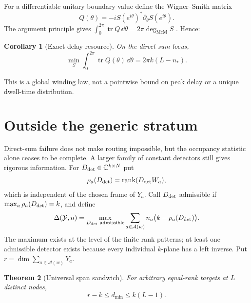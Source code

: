 \documentclass[11pt]{article}
\newtheorem{theorem}{Theorem}[section]
\newtheorem{corollary}[theorem]{Corollary}
\theoremstyle{definition}\newtheorem{definition}[theorem]{Definition}\newtheorem{example}[theorem]{Example}
\theoremstyle{remark}\newtheorem{remark}[theorem]{Remark}\newtheorem{limitation}[theorem]{Limitation}
\newcommand{\C}{\mathbb C}\newcommand{\D}{\mathbb D}\newcommand{\T}{\mathbb T}
\newcommand{\rank}{\operatorname{rank}}
\newcommand{\mcdeg}{\deg_{\mathrm{McM}}}\newcommand{\A}{\mathcal A}
\begin{document}
For a differentiable unitary boundary value define the Wigner--Smith matrix
\begin{equation}\label{eq:Q}
 Q(\theta)=-iS(e^{i\theta})^*\partial_\theta S(e^{i\theta}).
\end{equation}
The argument principle gives
$\int_0^{2\pi}\operatorname{tr}Q\,\dd\theta=2\pi\mcdeg S$
\cite{Wigner1955,Smith1960,Potapov1955}.  Hence:

\begin{corollary}[Exact delay resource]\label{cor:delay}
On the direct-sum locus,
\begin{equation}\label{eq:delay}
 \boxed{\quad
 \min_S\int_0^{2\pi}\operatorname{tr}Q(\theta)\,\dd\theta
       =2\pi k(L-n_*).\quad}
\end{equation}
\end{corollary}
This is a global winding law, not a pointwise bound on peak delay or a
unique dwell-time distribution.

\section{Outside the generic stratum}

Direct-sum failure does not make routing impossible, but the occupancy
statistic alone ceases to be complete.  A larger family of constant detectors
still gives rigorous information.  For $D_{\rm det}\in\C^{k\times N}$ put
\[
 \rho_a(D_{\rm det})=\rank(D_{\rm det}W_a),
\]
which is independent of the chosen frame of $Y_a$.  Call $D_{\rm det}$ admissible if
$\max_a\rho_a(D_{\rm det})=k$, and define
\begin{equation}\label{eq:detector-rank-statistic}
 \Delta(\mathcal Y,n)=
 \max_{D_{\rm det}\ {\rm admissible}}
       \sum_{a\in\A(w)} n_a\bigl(k-\rho_a(D_{\rm det})\bigr).
\end{equation}
The maximum exists at the level of the finite rank patterns; at least one
admissible detector exists because every individual $k$-plane has a left
inverse.  Put $r=\dim\sum_{a\in\A(w)}Y_a$.

\begin{theorem}[Universal span sandwich]\label{thm:sandwich}
For arbitrary equal-rank targets at $L$ distinct nodes,
\begin{equation}\label{eq:sandwich}
                         r-k\le d_{\min}\le k(L-1).
\end{equation}
\end{theorem}
\end{document}
